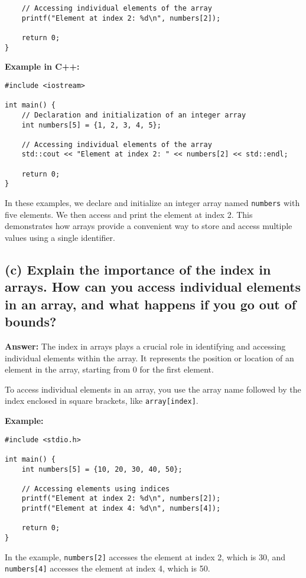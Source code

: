 \documentclass{article}
\begin{document}
\begin{enumerate}
\begin{verbatim}
    // Accessing individual elements of the array
    printf("Element at index 2: %d\n", numbers[2]);

    return 0;
}
\end{verbatim}

\textbf{Example in C++:}
\begin{verbatim}
#include <iostream>

int main() {
    // Declaration and initialization of an integer array
    int numbers[5] = {1, 2, 3, 4, 5};

    // Accessing individual elements of the array
    std::cout << "Element at index 2: " << numbers[2] << std::endl;

    return 0;
}
\end{verbatim}

In these examples, we declare and initialize an integer array named \texttt{numbers} with five elements. We then access and print the element at index 2. This demonstrates how arrays provide a convenient way to store and access multiple values using a single identifier.

\subsection*{(c) Explain the importance of the index in arrays. How can you access individual elements in an array, and what happens if you go out of bounds?}

\textbf{Answer:} The index in arrays plays a crucial role in identifying and accessing individual elements within the array. It represents the position or location of an element in the array, starting from 0 for the first element.

To access individual elements in an array, you use the array name followed by the index enclosed in square brackets, like \texttt{array[index]}.

\textbf{Example:}
\begin{verbatim}
#include <stdio.h>

int main() {
    int numbers[5] = {10, 20, 30, 40, 50};

    // Accessing elements using indices
    printf("Element at index 2: %d\n", numbers[2]);
    printf("Element at index 4: %d\n", numbers[4]);

    return 0;
}
\end{verbatim}

In the example, \texttt{numbers[2]} accesses the element at index 2, which is 30, and \texttt{numbers[4]} accesses the element at index 4, which is 50.


\end{enumerate}
\end{document}
